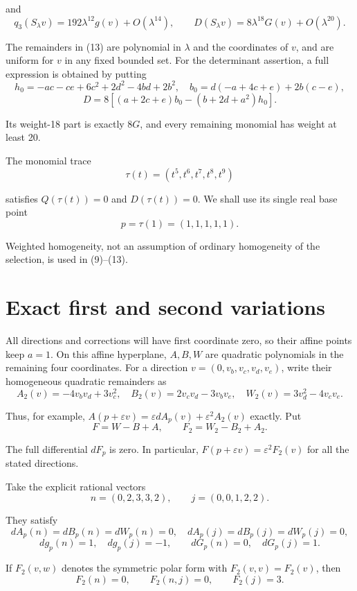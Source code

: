 \documentclass[11pt]{article}
\begin{document}
and
\[
q_3(S_\lambda v)=192\lambda^{12}g(v)+O(\lambda^{14}),
\qquad
D(S_\lambda v)=8\lambda^{18}G(v)+O(\lambda^{20}).
\tag{13}
\]

The remainders in (13) are polynomial in \(\lambda\) and the coordinates
of \(v\), and are uniform for \(v\) in any fixed bounded set. For
the determinant assertion, a full expression is obtained by putting
\[
h_0=-ac-ce+6c^2+2d^2-4bd+2b^2,\quad
b_0=d(-a+4c+e)+2b(c-e),
\]
\[
D=8[(a+2c+e)b_0-(b+2d+a^2)h_0].
\tag{14}
\]

Its weight-18 part is exactly \(8G\), and every remaining monomial
has weight at least 20.

The monomial trace
\[
\tau(t)=(t^5,t^6,t^7,t^8,t^9)
\tag{15}
\]

satisfies \(Q(\tau(t))=0\) and \(D(\tau(t))=0\). We shall use its
single real base point
\[
p=\tau(1)=(1,1,1,1,1).
\tag{16}
\]

Weighted homogeneity, not an assumption of ordinary homogeneity of the
selection, is used in (9)--(13).

\section{Exact first and second variations}

All directions and corrections will have first coordinate zero, so their
affine points keep \(a=1\). On this affine hyperplane, \(A,B,W\)
are quadratic polynomials in the remaining four coordinates. For a direction
\(v=(0,v_b,v_c,v_d,v_e)\), write their homogeneous quadratic remainders as
\[
A_2(v)=-4v_bv_d+3v_c^2,
\quad B_2(v)=2v_cv_d-3v_bv_e,
\quad W_2(v)=3v_d^2-4v_cv_e.
\tag{17}
\]

Thus, for example,
\(A(p+\varepsilon v)=\varepsilon dA_p(v)+\varepsilon^2A_2(v)\)
exactly. Put
\[
F=W-B+A,\qquad F_2=W_2-B_2+A_2.
\tag{18}
\]

The full differential \(dF_p\) is zero. In particular,
\(F(p+\varepsilon v)=\varepsilon^2F_2(v)\) for all the stated directions.

Take the explicit rational vectors
\[
n=(0,2,3,3,2),\qquad j=(0,0,1,2,2).
\tag{19}
\]

They satisfy
\[
dA_p(n)=dB_p(n)=dW_p(n)=0,
\quad dA_p(j)=dB_p(j)=dW_p(j)=0,
\]
\[
dg_p(n)=1,\quad dg_p(j)=-1,\qquad
dG_p(n)=0,\quad dG_p(j)=1.
\tag{20}
\]

If \(F_2(v,w)\) denotes the symmetric polar form with
\(F_2(v,v)=F_2(v)\), then
\[
F_2(n)=0,\qquad F_2(n,j)=0,\qquad F_2(j)=3.
\tag{21}
\]
\end{document}
